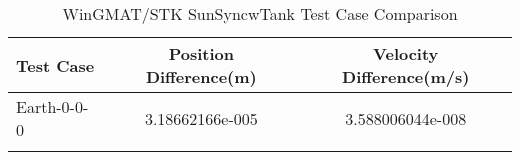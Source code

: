 \begin{table}[htbp!]
\centering
\caption{ WinGMAT/STK SunSyncwTank Test Case Comparison}
      \begin{tabular}{lcc}
      \hline\hline
          Test Case & Position Difference(m) & Velocity Difference(m/s) \\
         \hline
         Earth-0-0-0 & 3.18662166e-005 & 3.588006044e-008 \\
      \hline\hline
      \label{Table: SunSyncwTank WinGMAT-STK Table} 
\end{tabular}
\end{table}
